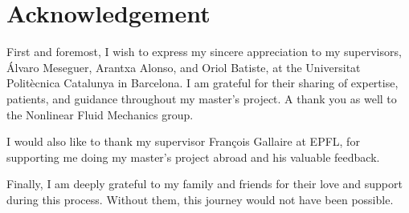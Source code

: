 
\section*{Acknowledgement}

First and foremost, I wish to express my sincere appreciation to my
supervisors, Álvaro Meseguer, Arantxa Alonso, and Oriol Batiste, at the
Universitat Politècnica Catalunya in Barcelona. I am grateful for their sharing
of expertise, patients, and guidance throughout my master's project. A thank
you as well to the Nonlinear Fluid Mechanics group.

I would also like to thank my supervisor François Gallaire at EPFL, for
supporting me doing my master's project abroad and his valuable feedback.

Finally, I am deeply grateful to my family and friends for their love and
support during this process. Without them, this journey would not have been
possible.
